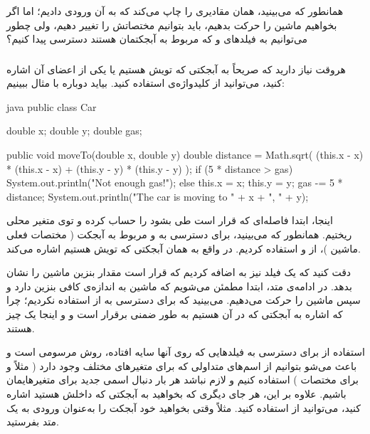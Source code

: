 همانطور که می‌\-بینید،  همان مقادیری را چاپ می\-‌کند
که به آن ورودی دادیم؛ اما اگر بخواهیم ماشین را حرکت بدهیم، باید بتوانیم
مختصاتش را تغییر دهیم، ولی چطور می\-‌توانیم به فیلدهای  و
 که مربوط به آبجکتمان هستند دسترسی پیدا کنیم؟

\subsubsection{}

هروقت نیاز دارید که صریحاً به آبجکتی که تویش هستیم یا یکی از اعضای آن
اشاره کنید، می‌\-توانید از کلیدواژه‌ی  استفاده کنید.
بیاید دوباره با مثال  ببینیم:

\begin{codebox}{java}
public class Car {
    double x;
    double y;
    double gas;
    
    public void moveTo(double x, double y) {
        double distance = Math.sqrt(  
            (this.x - x) * (this.x - x) + (this.y - y) * (this.y - y)  
        );
        if (5 * distance > gas) {  
            System.out.println("Not enough gas!");  
        } else {
            this.x = x;
            this.y = y;
            gas -= 5 * distance;  
            System.out.println("The car is moving to " + x + ", " + y);  
        }  
    }  
}
\end{codebox}

اینجا، ابتدا فاصله‌ای که قرار است طی بشود را حساب کرده و توی متغیر محلی
 ریختیم. همانطور که می\-‌بینید، برای دسترسی به
 و  مربوط به آبجکت ( مختصات فعلی ماشین )،
از  و  استفاده کردیم.
 در واقع به همان آبجکتی که تویش هستیم اشاره می\-‌کند.

دقت کنید که یک فیلد  نیز به  اضافه
کردیم که قرار است مقدار بنزین ماشین را نشان بدهد. در ادامه‌ی متد، ابتدا
مطمئن می‌\-شویم که ماشین به اندازه‌ی کافی بنزین دارد و سپس ماشین را حرکت
می\-‌دهیم. می‌\-بینید که برای دسترسی به  از
 استفاده نکردیم؛ چرا که اشاره به آبجکتی که در آن هستیم
به طور ضمنی برقرار است و  و 
اینجا یک چیز هستند.

استفاده از  برای دسترسی به فیلدهایی که روی آنها سایه
افتاده، روش مرسومی است و باعث می\-‌شو بتوانیم از اسم\-‌های متداولی که برای
متغیرهای مختلف وجود دارد ( مثلاً  و  برای
مختصات ) استفاده کنیم و لازم نباشد هر بار دنبال اسمی جدید برای
متغیرهایمان باشیم. علاوه بر این، هر جای دیگری که بخواهید به آبجکتی که
داخلش هستید اشاره کنید، می‌توانید از  استفاده کنید.
مثلاً وقتی بخواهید خود آبجکت را به‌عنوان ورودی به یک متد بفرستید.

